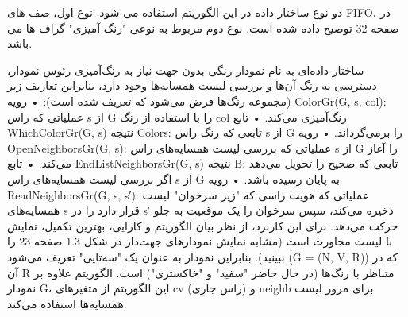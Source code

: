 \documentclass{book} %
\begin{document}
دو نوع ساختار داده در این الگوریتم استفاده می شود. نوع اول، صف های FIFO، در صفحه 32 توضیح داده شده است. نوع دوم مربوط به نوعی "رنگ آمیزی" گراف ها می باشد.

ساختار داده‌ای به نام نمودار رنگی بدون جهت
نیاز به رنگ‌آمیزی رئوس نمودار، دسترسی به رنگ آن‌ها و بررسی لیست همسایه‌ها وجود دارد، بنابراین تعاریف زیر (مجموعه رنگ‌ها فرض می‌شود که تعریف شده است):
• رویه ColorGr(G, s, col): عملیاتی که راس s از G را با استفاده از رنگ col رنگ‌آمیزی می‌کند.
• تابع WhichColorGr(G, s) نتیجه Colors: تابعی که رنگ راس s از G را برمی‌گرداند.
• رویه OpenNeighborsGr(G, s): عملیاتی که بررسی لیست همسایه‌های راس s از G را آغاز می‌کند.
• تابع EndListNeighborsGr(G, s) نتیجه B: تابعی که صحیح را تحویل می‌دهد اگر بررسی لیست همسایه‌های راس s از G به پایان رسیده باشد.
• رویه ReadNeighborsGr(G, s, s′): عملیاتی که هویت راسی که "زیر سرخوان" لیست همسایه‌های s قرار دارد را در s′ ذخیره می‌کند، سپس سرخوان را یک موقعیت به جلو حرکت می‌دهد.
برای این کاربرد، از نظر بیان الگوریتم و کارایی، بهترین تکمیل، نمایش با لیست مجاورت است (مشابه نمایش نمودارهای جهت‌دار در شکل 1.3 صفحه 23 را ببینید). بنابراین نمودار به عنوان یک "سه‌تایی" تعریف می‌شود (G = (N, V, R)) که در آن R متناظر با رنگ‌ها (در حال حاضر "سفید" و "خاکستری") است.
الگوریتم
علاوه بر نمودار G، این الگوریتم از متغیرهای cv (راس جاری) و neighb برای مرور لیست همسایه‌ها استفاده می‌کند.
\end{document}
